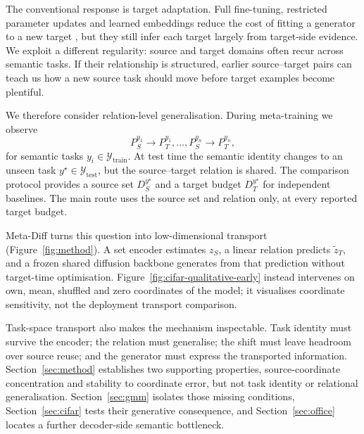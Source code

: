 \documentclass{article}
\newcommand{\Ttrain}{\mathcal{Y}_{\mathrm{train}}}
\newcommand{\Ttest}{\mathcal{Y}_{\mathrm{test}}}
\begin{document}
The conventional response is target adaptation. Full fine-tuning, restricted parameter updates and learned embeddings reduce the cost of fitting a generator to a new target \citep{ruiz2023dreambooth,kumari2023customdiffusion,hu2022lora,gal2023textualinversion,ruiz2024hyperdreambooth}, but they still infer each target largely from target-side evidence. We exploit a different regularity: source and target domains often recur across semantic tasks. If their relationship is structured, earlier source--target pairs can teach us how a new source task should move before target examples become plentiful.

We therefore consider relation-level generalisation. During meta-training we observe
\[
P_S^{y_1}\!\rightarrow P_T^{y_1},\ldots,P_S^{y_n}\!\rightarrow P_T^{y_n},
\]
for semantic tasks $y_i\in\Ttrain$. At test time the semantic identity changes to an unseen task $y^\star\in\Ttest$, but the source--target relation is shared. The comparison protocol provides a source set $D_S^{y^\star}$ and a target budget $D_T^{y^\star}$ for independent baselines. The main route uses the source set and relation only, at every reported target budget.

Meta-Diff turns this question into low-dimensional transport (Figure~\ref{fig:method}). A set encoder estimates $z_S$, a linear relation predicts $\widetilde z_T$, and a frozen shared diffusion backbone generates from that prediction without target-time optimisation. Figure~\ref{fig:cifar-qualitative-early} instead intervenes on own, mean, shuffled and zero coordinates of the model; it visualises coordinate sensitivity, not the deployment transport comparison.

Task-space transport also makes the mechanism inspectable. Task identity must survive the encoder; the relation must generalise; the shift must leave headroom over source reuse; and the generator must express the transported information. Section~\ref{sec:method} establishes two supporting properties, source-coordinate concentration and stability to coordinate error, but not task identity or relational generalisation. Section~\ref{sec:gmm} isolates those missing conditions, Section~\ref{sec:cifar} tests their generative consequence, and Section~\ref{sec:office} locates a further decoder-side semantic bottleneck.
\end{document}
